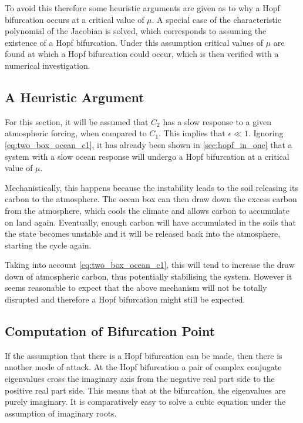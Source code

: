 To avoid this therefore some heuristic arguments are given as to why a Hopf bifurcation occurs at a critical value of $\mu$. A special case of the 
characteristic polynomial of the Jacobian is solved, which corresponds to assuming the existence of a Hopf bifurcation. Under this assumption 
critical values of $\mu$ are found at which a Hopf bifurcation could occur, which is then verified with a numerical investigation.

\subsection{A Heuristic Argument}
For this section, it will be assumed that $C_2$ has a slow response to a given atmospheric  forcing, when compared to $C_1$. This implies that $\epsilon \ll 1$.
Ignoring \cref{eq:two_box_ocean_c1}, it has already been shown in \cref{sec:hopf_in_one} that a system with a slow ocean response will undergo a Hopf bifurcation at a critical value of $\mu$.

Mechanistically, this happens because the instability leads to the soil releasing its carbon to the atmosphere. The ocean box can then draw down the excess carbon from the atmosphere, which cools
the climate and allows carbon to accumulate on land again. Eventually, enough carbon will have accumulated in the soils that the state becomes unstable and it will be released back into the atmosphere,
starting the cycle again.

Taking into account \cref{eq:two_box_ocean_c1}, this will tend to increase the draw down of atmospheric carbon, thus potentially stabilising the system. However it seems reasonable to expect that the above
mechanism will not be totally disrupted and therefore a Hopf bifurcation might still be expected.

\subsection{Computation of Bifurcation Point}
If the assumption that there is a Hopf bifurcation can be made, then there is another mode of attack. At the Hopf bifurcation a pair of complex conjugate eigenvalues
cross the imaginary axis from the negative real part side to the positive real part side. This means that at the bifurcation, the eigenvalues are purely imaginary. It is
comparatively easy to solve a cubic equation under the assumption of imaginary roots.

